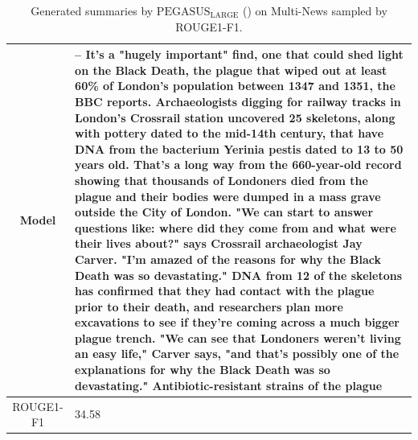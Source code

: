 \begin{table}[bth!]
\begin{tabular}{c|p{}}
\\ \hline
Model & 
– It's a "hugely important" find, one that could shed light on the Black Death, the plague that wiped out at least 60\% of London's population between 1347 and 1351, the BBC reports. Archaeologists digging for railway tracks in London's Crossrail station uncovered 25 skeletons, along with pottery dated to the mid-14th century, that have DNA from the bacterium Yerinia pestis dated to 13 to 50 years old. That's a long way from the 660-year-old record showing that thousands of Londoners died from the plague and their bodies were dumped in a mass grave outside the City of London. "We can start to answer questions like: where did they come from and what were their lives about?" says Crossrail archaeologist Jay Carver. "I'm amazed of the reasons for why the Black Death was so devastating." DNA from 12 of the skeletons has confirmed that they had contact with the plague prior to their death, and researchers plan more excavations to see if they're coming across a much bigger plague trench. "We can see that Londoners weren't living an easy life," Carver says, "and that's possibly one of the explanations for why the Black Death was so devastating." Antibiotic-resistant strains of the plague
\\ \hline
ROUGE1-F1 & 
34.58
\\ \hline
\end{tabular}
\caption{Generated summaries by $\text{PEGASUS}_{\text{LARGE}}$ (\gnews) on Multi-News sampled by ROUGE1-F1.}
\end{table}
